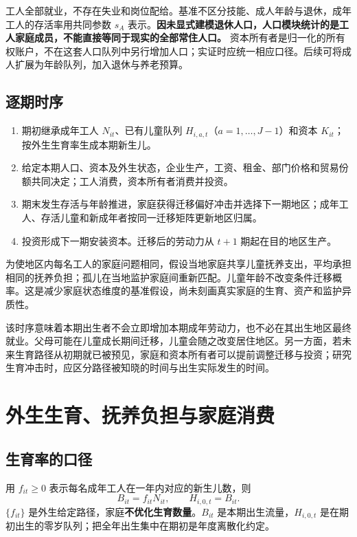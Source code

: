 \documentclass[UTF8,a4paper,zihao=-4,fontset=windows]{ctexart}
\numberwithin{equation}{section}
\begin{document}
工人全部就业，不存在失业和岗位配给。基准不区分技能、成人年龄与退休，成年工人的存活率用共同参数 $s_A$ 表示。\textbf{因未显式建模退休人口，人口模块统计的是工人家庭成员，不能直接等同于现实的全部常住人口。} 资本所有者是归一化的所有权账户，不在这套人口队列中另行增加人口；实证时应统一相应口径。后续可将成人扩展为年龄队列，加入退休与养老预算。

\subsection{逐期时序}
\begin{enumerate}
  \item 期初继承成年工人 $N_{it}$、已有儿童队列 $H_{i,a,t}$（$a=1,\ldots,J-1$）和资本 $K_{it}$；按外生生育率生成本期新生儿。
  \item 给定本期人口、资本及外生状态，企业生产，工资、租金、部门价格和贸易份额共同决定；工人消费，资本所有者消费并投资。
  \item 期末发生存活与年龄推进，家庭获得迁移偏好冲击并选择下一期地区；成年工人、存活儿童和新成年者按同一迁移矩阵更新地区归属。
  \item 投资形成下一期安装资本。迁移后的劳动力从 $t+1$ 期起在目的地区生产。
\end{enumerate}
为使地区内每名工人的家庭问题相同，假设当地家庭共享儿童抚养支出，平均承担相同的抚养负担；孤儿在当地监护家庭间重新匹配。儿童年龄不改变条件迁移概率。这是减少家庭状态维度的基准假设，尚未刻画真实家庭的生育、资产和监护异质性。

该时序意味着本期出生者不会立即增加本期成年劳动力，也不必在其出生地区最终就业。父母可能在儿童成长期间迁移，儿童会随之改变居住地区。另一方面，若未来生育路径从初期就已被预见，家庭和资本所有者可以提前调整迁移与投资；研究生育冲击时，应区分路径被知晓的时间与出生实际发生的时间。

\section{外生生育、抚养负担与家庭消费}
\label{sec:population}

\subsection{生育率的口径}
用 $f_{it}\geq0$ 表示每名成年工人在一年内对应的新生儿数，则
\begin{equation}
 B_{it}=f_{it}N_{it},\qquad H_{i,0,t}=B_{it}.
 \label{eq:birth}
\end{equation}
$\{f_{it}\}$ 是外生给定路径，家庭\textbf{不优化生育数量}。$B_{it}$ 是本期出生流量，$H_{i,0,t}$ 是在期初出生的零岁队列；把全年出生集中在期初是年度离散化约定。
\end{document}
